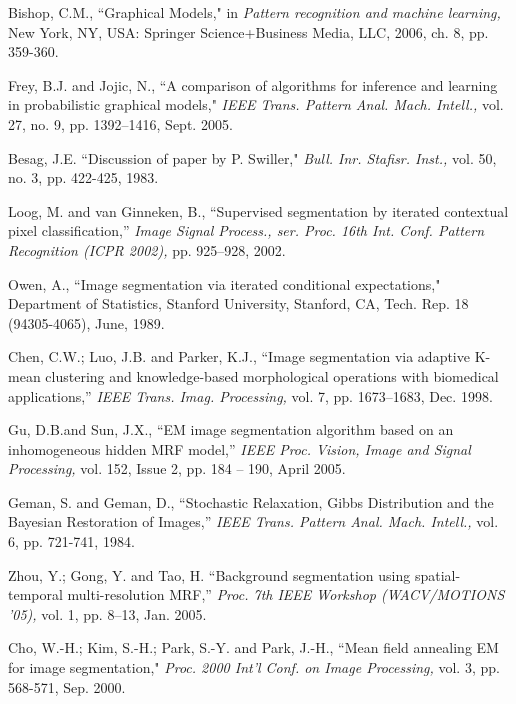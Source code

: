 \documentclass{article} %
\begin{document}
\small{
\begin{thebibliography}{1}

 Bishop, C.M., ``Graphical Models," in \textit{Pattern recognition and machine learning,} New York, NY, USA: Springer Science+Business Media, LLC, 2006, ch. 8, pp. 359-360.

 Frey, B.J. and Jojic, N., ``A comparison of algorithms for inference and learning in probabilistic graphical models," \textit{IEEE Trans. Pattern Anal. Mach. Intell.,} vol. 27, no. 9, pp. 1392–1416, Sept. 2005.

 Besag, J.E. ``Discussion of paper by P. Swiller," \textit{Bull. Inr. Stafisr. Inst.,} vol. 50, no. 3, pp. 422-425, 1983.

 Loog, M. and van Ginneken, B., ``Supervised segmentation by iterated contextual pixel classification,” \textit{Image Signal Process., ser. Proc. 16th Int. Conf. Pattern Recognition (ICPR 2002),} pp. 925–928, 2002.

 Owen, A., ``Image segmentation via iterated conditional expectations," Department of Statistics, Stanford University, Stanford, CA, Tech. Rep. 18 (94305-4065), June, 1989.

 Chen, C.W.; Luo, J.B. and Parker, K.J., ``Image segmentation via adaptive K-mean clustering and knowledge-based morphological operations with biomedical applications,” \textit{IEEE Trans. Imag. Processing,} vol. 7, pp. 1673–1683, Dec. 1998.

 Gu, D.B.and Sun, J.X., ``EM image segmentation algorithm based on an inhomogeneous hidden MRF model,” \textit{IEEE Proc. Vision, Image and Signal Processing,} vol. 152, Issue 2, pp. 184 – 190, April 2005.

 Geman, S. and Geman, D., ``Stochastic Relaxation, Gibbs Distribution and the Bayesian Restoration of Images,” \textit{IEEE Trans. Pattern Anal. Mach. Intell.,} vol. 6, pp. 721-741, 1984.

 Zhou, Y.; Gong, Y. and Tao, H. ``Background segmentation using spatial-temporal multi-resolution MRF,” \textit{Proc. 7th IEEE Workshop (WACV/MOTIONS '05),} vol. 1, pp. 8–13, Jan. 2005.

Cho, W.-H.; Kim, S.-H.; Park, S.-Y. and Park, J.-H., ``Mean field annealing EM for image segmentation," \textit{Proc. 2000 Int’l Conf. on Image Processing,} vol. 3, pp. 568-571, Sep. 2000.
  \end{thebibliography}
}
\end{document}
